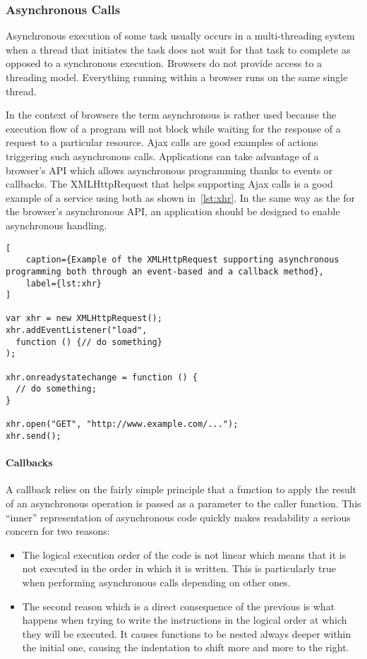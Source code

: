 \subsubsection{Asynchronous Calls}

Asynchronous execution of some task usually occurs in a multi-threading system when a thread that initiates the task does not wait for that task to complete as opposed to a synchronous execution. Browsers do not provide access to a threading model. Everything running within a browser runs on the same single thread.

In the context of browsers the term asynchronous is rather used because the execution flow of a program will not block while waiting for the response of a request to a particular resource. Ajax calls are good examples of actions triggering such asynchronous calls. Applications can take advantage of a browser's API which allows asynchronous programming thanks to events or callbacks. The XMLHttpRequest that helps supporting Ajax calls is a good example of a service using both as shown in~\ref{lst:xhr}. In the same way as the for the browser's asynchronous API, an application should be designed to enable asynchronous handling.

\begin{lstlisting}[
    caption={Example of the XMLHttpRequest supporting asynchronous programming both through an event-based and a callback method},
    label={lst:xhr}
]

var xhr = new XMLHttpRequest();
xhr.addEventListener("load", 
  function () {// do something}
);

xhr.onreadystatechange = function () {
  // do something;
}

xhr.open("GET", "http://www.example.com/...");
xhr.send();
\end{lstlisting}

\paragraph{Callbacks}

A callback relies on the fairly simple principle that a function to apply the result of an asynchronous operation is passed as a parameter to the caller function. This ``inner'' representation of asynchronous code quickly makes readability a serious concern for two reasons:
\begin{itemize}
    \item The logical execution order of the code is not linear which means that it is not executed in the order in which it is written. This is particularly true when performing asynchronous calls depending on other ones.
    \item The second reason which is a direct consequence of the previous is what happens when trying to write the instructions in the logical order at which they will be executed. It causes functions to be nested always deeper within the initial one, causing the indentation to shift more and more to the right.
\end{itemize}

